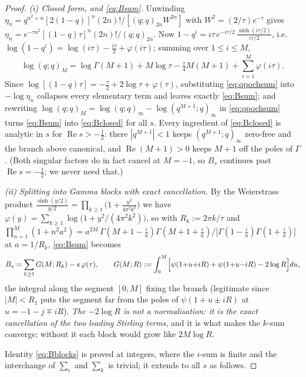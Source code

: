 \documentclass[11pt]{article}
\theoremstyle{plain}
\theoremstyle{definition}
\theoremstyle{remark}
\renewcommand{\Re}{\operatorname{Re}}
\begin{document}
\begin{proof}
\emph{(i) Closed form, and \eqref{eq:Bsum}.} Unwinding
$\eta_n=q^{n^2+n}[2(1-q)]^n(2n)!/[(q;q)_{2n}W^{2n}]$ with $W^2=(2/\tau)e^{-\tau}$ gives
$\eta_n=e^{-\tau n^2}[(1-q)\tau]^n(2n)!/(q;q)_{2n}$. Now
$1-q^i=i\tau\,e^{-i\tau/2}\,\frac{\sinh(i\tau/2)}{i\tau/2}$, i.e.
$\log(1-q^i)=\log(i\tau)-\tfrac{i\tau}2+\varphi(i\tau)$; summing over $1\le i\le M$,
\begin{equation}\label{eq:qpochsum}
   \log(q;q)_M=\log\Gamma(M{+}1)+M\log\tau-\tfrac\tau4M(M{+}1)+\sum_{i=1}^{M}\varphi(i\tau).
\end{equation}
Since $\log[(1-q)\tau]=-\tfrac\tau2+2\log\tau+\varphi(\tau)$, substituting \eqref{eq:qpochsum} into
$-\log\eta_n$ collapses every elementary term and leaves exactly \eqref{eq:Bsum}; and rewriting
$\log(q;q)_M=\log(q;q)_\infty-\log(q^{M+1};q)_\infty$ in \eqref{eq:qpochsum} turns \eqref{eq:Bsum}
into \eqref{eq:Bclosed} for all $s$. Every ingredient of \eqref{eq:Bclosed} is analytic in $s$ for
$\Re s>-\tfrac12$: there $|q^{M+1}|<1$ keeps $(q^{M+1};q)_\infty$ zero-free and the branch above
canonical, and $\Re(M{+}1)>0$ keeps $M{+}1$ off the poles of $\Gamma$. (Both singular factors do in
fact cancel at $M=-1$, so $B_s$ continues past $\Re s=-\tfrac12$; we never need that.)

\emph{(ii) Splitting into Gamma blocks with exact cancellation.} By the Weierstrass product
$\frac{\sinh(y/2)}{y/2}=\prod_{k\ge1}\bigl(1+\frac{y^2}{4\pi^2k^2}\bigr)$ we have
$\varphi(y)=\sum_{k\ge1}\log\bigl(1+y^2/(4\pi^2k^2)\bigr)$, so with $R_k:=2\pi k/\tau$ and
$\prod_{n=1}^{M}(1+n^2a^2)=a^{2M}\,\Gamma(M{+}1{-}\tfrac ia)\Gamma(M{+}1{+}\tfrac ia)/
\bigl[\Gamma(1{-}\tfrac ia)\Gamma(1{+}\tfrac ia)\bigr]$ at $a=1/R_k$, \eqref{eq:Bsum} becomes
\begin{equation}\label{eq:Bblocks}
   B_s=\sum_{k\ge1}G(M;R_k)-s\,\varphi(\tau),\qquad
   G(M;R):=\int_0^M\Bigl[\psi(1{+}u{+}iR)+\psi(1{+}u{-}iR)-2\log R\Bigr]du,
\end{equation}
the integral along the segment $[0,M]$ fixing the branch (legitimate since $|M|<R_1$ puts the
segment far from the poles of $\psi(1{+}u\pm iR)$ at $u=-1-j\mp iR$). \emph{The $-2\log R$ is not a
normalisation: it is the exact cancellation of the two leading Stirling terms}, and it is what
makes the $k$-sum converge; without it each block would grow like $2M\log R$.

Identity \eqref{eq:Bblocks} is proved at integers, where the $i$-sum is finite and the interchange
of $\sum_i$ and $\sum_k$ is trivial; it extends to all $s$ as follows.


\end{proof}
\end{document}
